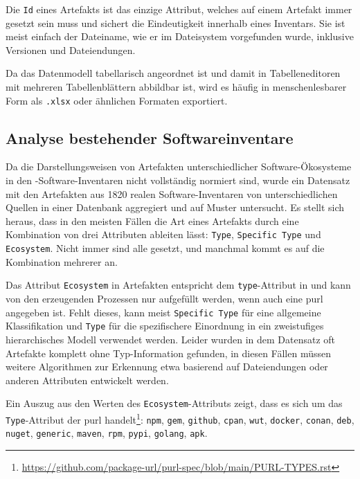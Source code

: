 Die \texttt{Id} eines Artefakts ist das einzige Attribut, welches auf einem Artefakt immer gesetzt sein muss und sichert die Eindeutigkeit innerhalb eines Inventars.
Sie ist meist einfach der Dateiname, wie er im Dateisystem vorgefunden wurde, inklusive Versionen und Dateiendungen.

Da das Datenmodell tabellarisch angeordnet ist und damit in Tabelleneditoren mit mehreren Tabellenblättern abbildbar ist, wird es häufig in menschenlesbarer Form als \texttt{.xlsx} oder ähnlichen Formaten exportiert.

\subsection{Analyse bestehender Softwareinventare}\label{subsec:analysis-ae-software-inventories}

Da die Darstellungsweisen von Artefakten unterschiedlicher Software-Ökosysteme in den \metaeffekt-Software-Inventaren nicht vollständig normiert sind, wurde ein Datensatz mit den Artefakten aus 1820 realen Software-Inventaren von unterschiedlichen Quellen in einer Datenbank aggregiert und auf Muster untersucht.
Es stellt sich heraus, dass in den meisten Fällen die Art eines Artefakts durch eine Kombination von drei Attributen ableiten lässt: \texttt{Type}, \texttt{Specific Type} und \texttt{Ecosystem}.
Nicht immer sind alle gesetzt, und manchmal kommt es auf die Kombination mehrerer an.

Das Attribut \texttt{Ecosystem} in Artefakten entspricht dem \texttt{type}-Attribut in  und kann von den erzeugenden Prozessen nur aufgefüllt werden, wenn auch eine \acrshort{purl} angegeben ist.
Fehlt dieses, kann meist \texttt{Specific Type} für eine allgemeine Klassifikation und \texttt{Type} für die spezifischere Einordnung in ein zweistufiges hierarchisches Modell verwendet werden.
Leider wurden in dem Datensatz oft Artefakte komplett ohne Typ-Information gefunden, in diesen Fällen müssen weitere Algorithmen zur Erkennung etwa basierend auf Dateiendungen oder anderen Attributen entwickelt werden.

Ein Auszug aus den Werten des \texttt{Ecosystem}-Attributs zeigt, dass es sich um das \texttt{Type}-Attribut der \acrshort{purl} handelt\footnote{\url{https://github.com/package-url/purl-spec/blob/main/PURL-TYPES.rst}}:
\texttt{npm}, \texttt{gem}, \texttt{github}, \texttt{cpan}, \texttt{wut}, \texttt{docker}, \texttt{conan}, \texttt{deb}, \texttt{nuget}, \texttt{generic}, \texttt{maven}, \texttt{rpm}, \texttt{pypi}, \texttt{golang}, \texttt{apk}.

